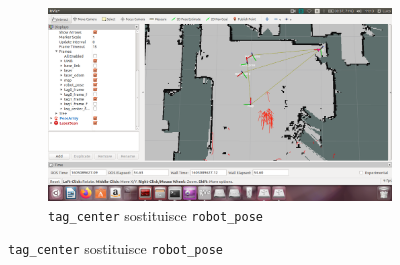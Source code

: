 \begin{figure}[h]
\begin{minipage}[c]{\textwidth}
  \centering
\begin{subfigure}{.5\textwidth}
  \centering
  \includegraphics[width=1\linewidth]{Capitolo3/Figs/esperimento3_4a_tag_center_sostituisce_robot_pose.png}  
  \caption{\texttt{tag\_center} sostituisce \texttt{robot\_pose}}
  \label{subfig:esp3_4b}
\end{subfigure}
\end{minipage}
\end{figure}

